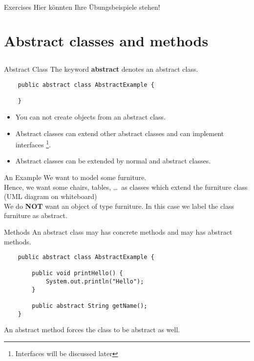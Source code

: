 \begin{frame}[fragile]{Exercises}
	\huge Hier könnten Ihre Übungsbeispiele stehen!
\end{frame}

\section{Abstract classes and methods}
\subsection{}
\begin{frame}[fragile]{Abstract Class}
	The keyword \textbf{abstract} denotes an abstract class.
	\vfill
	\begin{lstlisting}
	public abstract class AbstractExample {
	
	}	
	\end{lstlisting}
	\vfill
    \begin{itemize}
	\item You can not create objects from an abstract class.\\
	\item Abstract classes can extend other abstract classes and can implement interfaces \footnote[1]{Interfaces will be discussed later}.\\
	\item Abstract classes can be extended by normal and abstract classes.
    \end{itemize}
\end{frame}

\begin{frame}[fragile]{An Example}
	We want to model some furniture. \\
	\vspace{0.5cm}
	Hence, we want some chairs, tables, \dots\ as classes which extend the furniture class (UML diagram on whiteboard)\\
	\vspace{0.25cm}
	We do \textbf{NOT} want an object of type furniture. In this case we label the class furniture as abstract.
\end{frame}

\begin{frame}[fragile]{Methods}
	An abstract class may has concrete methods and may has abstract methods.
	\begin{lstlisting}
	public abstract class AbstractExample {
	
	    public void printHello() {
	        System.out.println("Hello");	    
	    }
	    
	    public abstract String getName();
	}	
	\end{lstlisting}
	An abstract method forces the class to be abstract as well. \\
\end{frame}

